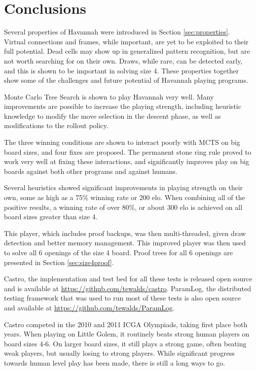 
\section{Conclusions}

Several properties of Havannah were introduced in Section \ref{sec:properties}. Virtual connections and frames, while important, are yet to be exploited to their full potential. Dead cells may show up in generalized pattern recognition, but are not worth searching for on their own. Draws, while rare, can be detected early, and this is shown to be important in solving size 4. These properties together show some of the challenges and future potential of Havannah playing programs.

Monte Carlo Tree Search is shown to play Havannah very well. Many improvements are possible to increase the playing strength, including heuristic knowledge to modify the move selection in the descent phase, as well as modifications to the rollout policy.

The three winning conditions are shown to interact poorly with MCTS on big board sizes, and four fixes are proposed. The permanent stone ring rule proved to work very well at fixing these interactions, and significantly improves play on big boards against both other programs and against humans.

Several heuristics showed significant improvements in playing strength on their own, some as high as a 75\% winning rate or 200 elo. When combining all of the positive results, a winning rate of over 80\%, or about 300 elo is achieved on all board sizes greater than size 4.

This player, which includes proof backups, was then multi-threaded, given draw detection and better memory management. This improved player was then used to solve all 6 openings of the size 4 board. Proof trees for all 6 openings are presented in Section \ref{sec:size4proof}.

Castro, the implementation and test bed for all these tests is released open source and is available at \url{https://github.com/tewalds/castro}. ParamLog, the distributed testing framework that was used to run most of these tests is also open source and available at \url{https://github.com/tewalds/ParamLog}.

Castro competed in the 2010 and 2011 ICGA Olympiads, taking first place both years. When playing on Little Golem, it routinely beats strong human players on board sizes 4-6. On larger board sizes, it still plays a strong game, often beating weak players, but usually losing to strong players. While significant progress towards human level play has been made, there is still a long ways to go.

